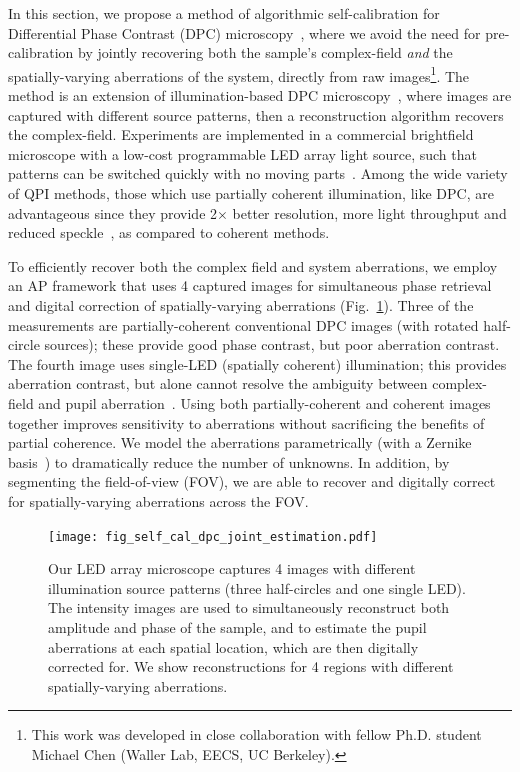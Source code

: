 In this section, we propose a method of algorithmic self-calibration for Differential Phase Contrast (DPC) microscopy~\cite{kachar1985asymmetric,mehta2009quantitative,tian2015quantitative,Claus2015,chen20163d,PhillipsChen17cDPC}, where we avoid the need for pre-calibration by jointly recovering both the sample's complex-field \textit{and} the spatially-varying aberrations of the system, directly from raw images\footnote{This work was developed in close collaboration with fellow Ph.D. student Michael Chen (Waller Lab, EECS, UC Berkeley).}. The method is an extension of illumination-based DPC microscopy~\cite{mehta2009quantitative,tian2015quantitative}, where images are captured with different source patterns, then a reconstruction algorithm recovers the complex-field. Experiments are implemented in a commercial brightfield microscope with a low-cost programmable LED array light source, such that patterns can be switched quickly with no moving parts~\cite{Zheng2013,Liu2014,tian2015quantitative,tian2015computational}. Among the wide variety of QPI methods, those which use partially coherent illumination, like DPC, are advantageous since they provide 2$\times$ better resolution, more light throughput and reduced speckle~\cite{Wang2011,rodrigo2014rapid,jingshan2015partially,tian2015quantitative}, as compared to coherent methods.


To efficiently recover both the complex field and system aberrations, we employ an AP framework that uses 4 captured images for simultaneous phase retrieval and digital correction of spatially-varying aberrations (Fig.~\ref{fig:self_cal_dpc_joint_estimation}). Three of the measurements are partially-coherent conventional DPC images (with rotated half-circle sources); these provide good phase contrast, but poor aberration contrast. The fourth image uses single-LED (spatially coherent) illumination; this provides aberration contrast, but alone cannot resolve the ambiguity between complex-field and pupil aberration~\cite{lu2016quantitative}. Using both partially-coherent and coherent images together improves sensitivity to aberrations without sacrificing the benefits of partial coherence. We model the aberrations parametrically (with a Zernike basis~\cite{ZERNIKE1934689, zheng2013characterization}) to dramatically reduce the number of unknowns. In addition, by segmenting the field-of-view (FOV), we are able to recover and digitally correct for spatially-varying aberrations across the FOV.

\begin{figure}[ht!]
\centering\texttt{[image: fig\_self\_cal\_dpc\_joint\_estimation.pdf]}
\caption{\label{fig:self_cal_dpc_joint_estimation} Our LED array microscope captures 4 images with different illumination source patterns (three half-circles and one single LED). The intensity images are used to simultaneously reconstruct both amplitude and phase of the sample, and to estimate the pupil aberrations at each spatial location, which are then digitally corrected for. We show reconstructions for 4 regions with different spatially-varying aberrations.}
\end{figure}

